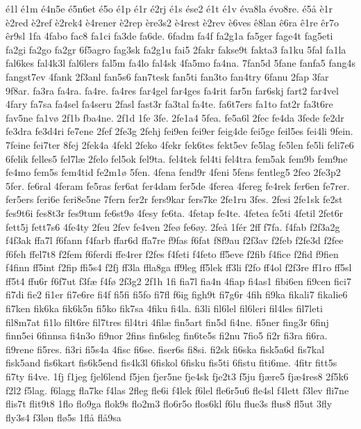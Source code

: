 {é1l
é1m
é4n5e
é5n6et
é5o
é1p
é1r
é2rj
é1s
ése2
é1t
é1v
éva8la
évo8re.
é5å
è1r
è2red
è2ref
è2rek4
è4rener
è2rep
ère3s2
è4rest
è2rev
è6ves
ê8lan
ê6ra
ê1re
êr7o
êr9sl
1fa
4fabo
fac8
fa1ci
fa3de
fa6de.
6fadm
fa4f
fa2g1a
fa5ger
fage4t
fag5eti
fa2gi
fa2go
fa2gr
6f5agro
fag3sk
fa2g1u
fai5
2fakr
fakse9t
fakta3
fa1ku
5fal
fa1la
fal6kes
fal4k3l
fal6lers
fal5m
fa4lo
fal4sk
4fa5mo
fa4na.
7fan5d
5fane
fanfa5
fang4s
fangst7ev
4fank
2f3anl
fan5s6
fan7tesk
fan5ti
fan3to
fan4try
6fanu
2fap
3far
9f8ar.
fa3ra
fa4ra.
fa4re.
fa4res
far4gel
far4ges
fa4rit
far5n
far6skj
fart2
far4vel
4fary
fa7sa
fa4sel
fa4seru
2fasl
fast3r
fa3tal
fa4te.
fa6t7ers
fa1to
fat2r
fa3t6re
fav5ne
fa1vø
2f1b
fba4ne.
2f1d
1fe
3fe.
2fe1a4
5fea.
fe5a6l
2fec
fe4da
3fede
fe2dr
fe3dra
fe3d4ri
fe7ene
2fef
2fe3g
2fehj
fei9en
fei9er
feig4de
fei5ge
feil5es
fei4li
9fein.
7feine
fei7ter
8fej
2fek4a
4fekl
2feko
4fekr
fek6tes
fekt5ev
fe5lag
fe5len
fe5li
feli7e6
6felik
felles5
fel7læ
2felo
fel5ok
fel9ta.
fel4tek
fel4ti
fel4tra
fem5ak
fem9b
fem9ne
fe4mo
fem5s
fem4tid
fe2m1ø
5fen.
4fena
fend9r
4feni
5fens
fentleg5
2feo
2fe3p2
5fer.
fe6ral
4feram
fe5ras
fer6at
fer4dam
fer5de
4ferea
4fereg
fe4rek
fer6en
fe7rer.
fer5ers
feri6e
feri8e5ne
7fern
fer2r
fers9kar
fers7ke
2fe1ru
3fes.
2fesi
2fe1sk
fe2st
fes9t6i
fes8t3r
fes9tum
fe6st9ø
4fesy
fe6ta.
4fetap
fe4te.
4fetea
fe5ti
4fetil
2fet6r
fett5j
fett7s6
4fe4ty
2feu
2fev
fe4ven
2feø
fe6øy.
2feå
1fér
2ff
f7fa.
f4fab
f2f3a2g
f4f3ak
ffa7l
f6fann
f4farb
ffar6d
ffa7re
f9fas
f6fat
f8f9au
f2f3av
f2feb
f2fe3d
f2fee
f6feh
ffel7t8
f2fem
f6ferdi
ffe4rer
f2fes
f4feti
f4feto
ff5eve
f2fib
f4fice
f2fid
f9fien
f4finn
ff5int
f2fip
ffi5s4
f2fj
ff3la
ffla8ga
ff9leg
ff5lek
ff3li
f2fo
ff4ol
f2f3re
ff1ro
ff5sl
ff5t4
ffu6r
f6f7ut
f3fæ
f4fø
2f3g2
2f1h
1fi
fia7l
fia4n
4fiap
fi4as1
fibi6en
fi9cen
fici7
fi7di
fie2
fi1er
fi7e6re
fi4f
fi5fi
fi5fo
fi7fl
f6ig
figh9t
fi7g6r
4fih
fi9ka
fikali7
fikalie6
fi7ken
fik6ka
fik6k5n
fi5ko
fik7sa
4fiku
fi4la.
fi3li
fil6lel
fil6leri
fil4les
fil7leti
fil8m7at
fi1lo
filt6re
fil7tres
fil4tri
4filæ
fin5art
fin5d
fi4ne.
fi5ner
fing3r
6finj
finn5ei
6finnsa
fi4n3o
fi9nor
2fins
fin6sleg
fin6te5s
fi2nu
7fio5
fi2r
fi3ra
fi6ra.
fi9rene
fi5res.
fi3ri
fi5s4a
4fisc
fi6se.
fiser6s
fi8si.
fi2sk
fi6ska
fisk5a6d
fis7kal
fisk5and
fis6kart
fis6k5end
fis4k3l
6fiskol
6fisku
fis5ti
6fistu
fiti6me.
4fitr
fitt5s
fi7ty
fi4ve.
1fj
f1jeg
fjel6lend
f5jen
fjer5ne
fje4sk
fje2t3
f5ju
fjære5
fjæ4res8
2f5k6
f2l2
f5lag.
f6lagg
fla7ke
f4las
2fleg
fle6i
f4lek
f6lel
fle6r5u6
fle4sl
f4lett
f3lev
fli7ne
flis7t
flit9t8
1flo
flo9ga
flok9s
flo2m3
flo6r5o
flos6kl
f6lu
flue3s
flus8
fl5ut
3fly
fly3s4
f3løn
flø5s
1flå
flå9sa
}
